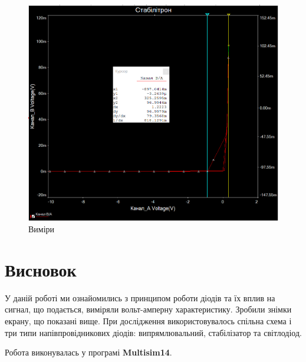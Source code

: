 \documentclass[
  ukrainian,
  14pt
]{extreport}
\begin{document}
\begin{figure}[H]
    \centering
    \includegraphics[width=.6\textwidth]{imgs/S-4.png}
    \caption{Виміри}
\end{figure}

\section{Висновок}
У даній роботі ми ознайомились з принципом роботи діодів та їх вплив на сигнал, що подається, виміряли вольт-амперну характеристику. Зробили знімки екрану, що показані вище.  При дослідження використовувалось спільна схема і три типи
напівпровідникових діодів: випрямлювальний, стабілізатор та світлодіод.


Робота виконувалась у програмі \textbf{Multisim14}.
\end{document}

